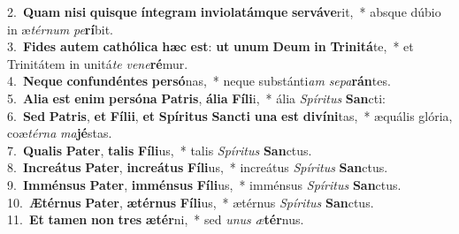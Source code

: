 {2.~}\textbf{Quam} \textbf{ni}\textbf{si} \textbf{quis}\textbf{que} \textbf{ín}\textbf{te}\textbf{gram} \textbf{in}\textbf{vi}\textbf{o}\textbf{la}\textbf{tám}\textbf{que} \textbf{ser}\textbf{vá}\textbf{ve}rit,~* absque dúbio in æ\textit{tér}\textit{num} \textit{pe}\textbf{rí}bit.\\
{3.~}\textbf{Fi}\textbf{des} \textbf{au}\textbf{tem} \textbf{ca}\textbf{thó}\textbf{li}\textbf{ca} \textbf{hæc} \textbf{est}: \textbf{ut} \textbf{u}\textbf{num} \textbf{De}\textbf{um} \textbf{in} \textbf{Tri}\textbf{ni}\textbf{tá}te,~* et Trinitátem in unitá\textit{te} \textit{ve}\textit{ne}\textbf{ré}mur.\\
{4.~}\textbf{Ne}\textbf{que} \textbf{con}\textbf{fun}\textbf{dén}\textbf{tes} \textbf{per}\textbf{só}nas,~* neque substánti\textit{am} \textit{se}\textit{pa}\textbf{rán}tes.\\
{5.~}\textbf{A}\textbf{li}\textbf{a} \textbf{est} \textbf{e}\textbf{nim} \textbf{per}\textbf{só}\textbf{na} \textbf{Pa}\textbf{tris}, \textbf{á}\textbf{li}\textbf{a} \textbf{Fí}\textbf{li}i,~* ália \textit{Spí}\textit{ri}\textit{tus} \textbf{San}cti:\\
{6.~}\textbf{Sed} \textbf{Pa}\textbf{tris}, \textbf{et} \textbf{Fí}\textbf{li}\textbf{i}, \textbf{et} \textbf{Spí}\textbf{ri}\textbf{tus} \textbf{San}\textbf{cti} \textbf{u}\textbf{na} \textbf{est} \textbf{di}\textbf{ví}\textbf{ni}tas,~* æquális glória, coæ\textit{tér}\textit{na} \textit{ma}\textbf{jé}stas.\\
{7.~}\textbf{Qua}\textbf{lis} \textbf{Pa}\textbf{ter}, \textbf{ta}\textbf{lis} \textbf{Fí}\textbf{li}us,~* talis \textit{Spí}\textit{ri}\textit{tus} \textbf{San}ctus.\\
{8.~}\textbf{In}\textbf{cre}\textbf{á}\textbf{tus} \textbf{Pa}\textbf{ter}, \textbf{in}\textbf{cre}\textbf{á}\textbf{tus} \textbf{Fí}\textbf{li}us,~* increátus \textit{Spí}\textit{ri}\textit{tus} \textbf{San}ctus.\\
{9.~}\textbf{Im}\textbf{mén}\textbf{sus} \textbf{Pa}\textbf{ter}, \textbf{im}\textbf{mén}\textbf{sus} \textbf{Fí}\textbf{li}us,~* imménsus \textit{Spí}\textit{ri}\textit{tus} \textbf{San}ctus.\\
{10.~}\textbf{Æ}\textbf{tér}\textbf{nus} \textbf{Pa}\textbf{ter}, \textbf{æ}\textbf{tér}\textbf{nus} \textbf{Fí}\textbf{li}us,~* ætérnus \textit{Spí}\textit{ri}\textit{tus} \textbf{San}ctus.\\
{11.~}\textbf{Et} \textbf{ta}\textbf{men} \textbf{non} \textbf{tres} \textbf{æ}\textbf{tér}ni,~* sed \textit{u}\textit{nus} \textit{æ}\textbf{tér}nus.\\
